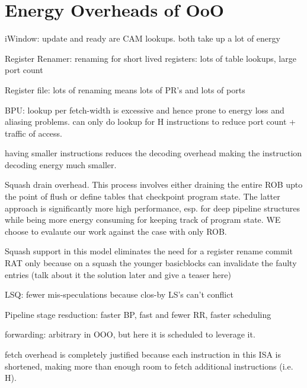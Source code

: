 \section{Energy Overheads of OoO}
\label{sec:o3_overhead}

iWindow: update and ready are CAM lookups. both take up a lot of energy

Register Renamer: renaming for short lived registers: lots of table lookups,
         large port count

Register file: lots of renaming means lots of PR's and lots of ports

BPU: lookup per fetch-width is excessive and hence prone to energy loss and
aliasing problems. can only do lookup for H instructions
to reduce port count + traffic of access.

having smaller instructions reduces the decoding overhead making the instruction
decoding energy much smaller.

Squash drain overhead. This process involves either draining the entire ROB upto
the point of flush or define tables that checkpoint program state. The latter
approach is significantly more high performance, esp. for deep pipeline
structures while being more energy consuming for keeping track of program state.
WE choose to evalaute our work against the case with only ROB. 

Squash support in this model eliminates the need for a register rename commit
RAT only because on a squash the younger basicblocks can invalidate the faulty
entries (talk about it the solution later and give a teaser here)

LSQ: fewer mis-speculations because clos-by LS's can't conflict

Pipeline stage resduction: faster BP, fast and fewer RR, faster scheduling

forwarding: arbitrary in OOO, but here it is scheduled to leverage it.


fetch overhead is completely justified because each instruction in this ISA is
shortened, making more than enough room to fetch additional instructions (i.e.
        H).
 
